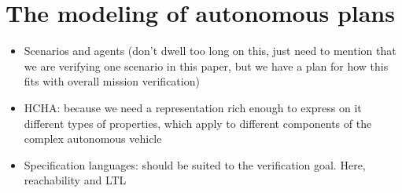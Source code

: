 \section{The modeling of autonomous plans}
\label{framework}

\begin{itemize}
	\item Scenarios and agents (don't dwell too long on this, just need to mention that we are verifying one scenario in this paper, but we have a plan for how this fits with overall mission verification)
	
	\item HCHA: because we need a representation rich enough to express on it different types of properties, which apply to different components of the complex autonomous vehicle
	
	\item Specification languages: should be suited to the verification goal. Here, reachability and LTL
	
\end{itemize}






